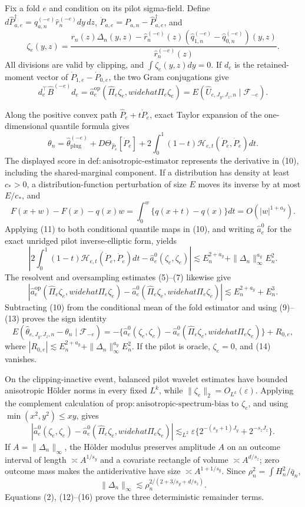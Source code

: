 Fix a fold \(e\) and condition on its pilot sigma-field.  Define \(d\widehat P_{a,e}^{\dagger}=\widehat q_{a,n}^{(-e)}\widehat r_n^{(-e)}dy\,dz\), \(\dot P_{a,e}=P_{a,n}-\widehat P_{a,e}^{\dagger}\), and
\[
\zeta_e(y,z)=
\frac{r_n(z)\Delta_n(y,z)-\widehat r_n^{(-e)}(z)
(\widehat q_{1,n}^{(-e)}-\widehat q_{0,n}^{(-e)})(y,z)}
{\widehat r_n^{(-e)}(z)}. \tag{8}
\]
All divisions are valid by clipping, and \(\int\zeta_e(y,z)dy=0\).  If \(d_e\) is the retained-moment vector of \(\dot P_{1,e}-\dot P_{0,e}\), the two Gram conjugations give
\[
d_e^\top\widehat B^{(-e)}d_e
=\widehat a_e^{\mathrm{op}}(\widehat\Pi_e\zeta_e,widehat\Pi_e\zeta_e)
=E(\widehat U_{e,J_y,J_z,n}\mid\mathscr F_{-e}). \tag{9}
\]

Along the positive convex path \(\widehat P_e+t\dot P_e\), exact Taylor expansion of the one-dimensional quantile formula gives
\[
\theta_n=\widehat\theta_{\mathrm{plug}}^{(-e)}
+D\Theta_{\widehat P_e}[\dot P_e]
+2\int_0^1(1-t)\mathcal H_{e,t}(\dot P_e,\dot P_e)dt. \tag{10}
\]
The displayed score in \(\mathrm{def{:}anisotropic\text{-}estimator}\) represents the derivative in (10), including the shared-marginal component.  If a distribution has density at least \(c_*>0\), a distribution-function perturbation of size \(E\) moves its inverse by at most \(E/c_*\), and
\[
F(x+w)-F(x)-q(x)w
=\int_0^w\{q(x+t)-q(x)\}dt=O(|w|^{1+a_y}). \tag{11}
\]
Applying (11) to both conditional quantile maps in (10), and writing \(\widehat a_e^0\) for the exact unridged pilot inverse-elliptic form, yields
\[
\left|2\int_0^1(1-t)\mathcal H_{e,t}(\dot P_e,\dot P_e)dt
-\widehat a_e^0(\zeta_e,\zeta_e)\right|
\lesssim E_n^{2+a_y}+\|\Delta_n\|_\infty^{a_y}E_n^2. \tag{12}
\]
The resolvent and oversampling estimates (5)--(7) likewise give
\[
|\widehat a_e^{\mathrm{op}}(\widehat\Pi_e\zeta_e,widehat\Pi_e\zeta_e)
-\widehat a_e^0(\widehat\Pi_e\zeta_e,widehat\Pi_e\zeta_e)|
\lesssim E_n^{2+a_y}+E_n^3. \tag{13}
\]
Subtracting (10) from the conditional mean of the fold estimator and using (9)--(13) proves the sign identity
\[
E(\widehat\theta_{e,J_y,J_z,n}-\theta_n\mid\mathscr F_{-e})
=-\{\widehat a_e^0(\zeta_e,\zeta_e)
-\widehat a_e^0(\widehat\Pi_e\zeta_e,widehat\Pi_e\zeta_e)\}+R_{0,e}, \tag{14}
\]
where \(|R_{0,e}|\lesssim E_n^{2+a_y}+\|\Delta_n\|_\infty^{a_y}E_n^2\).  If the pilot is oracle, \(\zeta_e=0\), and (14) vanishes.

On the clipping-inactive event, balanced pilot wavelet estimates have bounded anisotropic H\"older norms in every fixed \(L^k\), while \(\|\zeta_e\|_2=O_{L^k}(\varepsilon)\).  Applying the complement calculation of \(\mathrm{prop{:}anisotropic\text{-}spectrum\text{-}bias}\) to \(\zeta_e\), and using \(\min(x^2,y^2)\le xy\), gives
\[
|\widehat a_e^0(\zeta_e,\zeta_e)
-\widehat a_e^0(\widehat\Pi_e\zeta_e,widehat\Pi_e\zeta_e)|
\lesssim_{L^2}\varepsilon\{2^{-(s_y+1)J_y}+2^{-s_zJ_z}\}. \tag{15}
\]
If \(A=\|\Delta_n\|_\infty\), the H\"older modulus preserves amplitude \(A\) on an outcome interval of length \(\asymp A^{1/s_y}\) and a covariate rectangle of volume \(\asymp A^{d/s_z}\); zero outcome mass makes the antiderivative have size \(\asymp A^{1+1/s_y}\).  Since \(\rho_n^2=\int H_n^2/\bar q_n\),
\[
\|\Delta_n\|_\infty\lesssim
\rho_n^{2/(2+3/s_y+d/s_z)}. \tag{16}
\]
Equations (2), (12)--(16) prove the three deterministic remainder terms.

